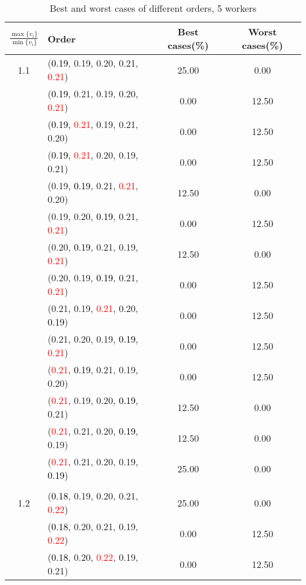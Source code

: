 \documentclass[10pt,a4paper]{report}
\begin{document}
\newpage\begin{center}
	\small
	\begin{longtable}{clcc}
		\caption{Best and worst cases of different orders, 5 workers}\\
		\toprule
		\setlength{\tabcolsep}{1mm}
		\renewcommand\baselinestretch{0.5}\selectfont
		$\frac{\max\{v_i\}}{\min\{v_i\}}$ & Order & Best cases(\%) & Worst cases(\%) \\
			\midrule		1.1			&(\textcolor{black}{0.19}, 0.19, 0.20, 0.21, \textcolor{red}{0.21})&25.00&0.00\\
			&(\textcolor{black}{0.19}, 0.21, 0.19, 0.20, \textcolor{red}{0.21})&0.00&12.50\\
			&(\textcolor{black}{0.19}, \textcolor{red}{0.21}, 0.19, 0.21, 0.20)&0.00&12.50\\
			&(\textcolor{black}{0.19}, \textcolor{red}{0.21}, 0.20, 0.19, 0.21)&0.00&12.50\\
			&(0.19, \textcolor{black}{0.19}, 0.21, \textcolor{red}{0.21}, 0.20)&12.50&0.00\\
			&(0.19, 0.20, \textcolor{black}{0.19}, 0.21, \textcolor{red}{0.21})&0.00&12.50\\
			&(0.20, \textcolor{black}{0.19}, 0.21, 0.19, \textcolor{red}{0.21})&12.50&0.00\\
			&(0.20, 0.19, \textcolor{black}{0.19}, 0.21, \textcolor{red}{0.21})&0.00&12.50\\
			&(0.21, 0.19, \textcolor{red}{0.21}, 0.20, \textcolor{black}{0.19})&0.00&12.50\\
			&(0.21, 0.20, 0.19, \textcolor{black}{0.19}, \textcolor{red}{0.21})&0.00&12.50\\
			&(\textcolor{red}{0.21}, \textcolor{black}{0.19}, 0.21, 0.19, 0.20)&0.00&12.50\\
			&(\textcolor{red}{0.21}, 0.19, 0.20, \textcolor{black}{0.19}, 0.21)&12.50&0.00\\
			&(\textcolor{red}{0.21}, 0.21, 0.20, \textcolor{black}{0.19}, 0.19)&12.50&0.00\\
			&(\textcolor{red}{0.21}, 0.21, 0.20, 0.19, \textcolor{black}{0.19})&25.00&0.00\\
		&&&\\
		1.2			&(\textcolor{black}{0.18}, 0.19, 0.20, 0.21, \textcolor{red}{0.22})&25.00&0.00\\
			&(\textcolor{black}{0.18}, 0.20, 0.21, 0.19, \textcolor{red}{0.22})&0.00&12.50\\
			&(\textcolor{black}{0.18}, 0.20, \textcolor{red}{0.22}, 0.19, 0.21)&0.00&12.50\\

\end{longtable}
\end{center}
\end{document}

